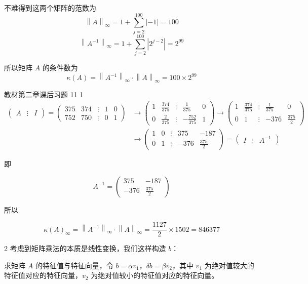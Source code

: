 不难得到这两个矩阵的范数为
\[\left\| A \right\|_{\infty} = 1 + \sum_{j = 2}^{100}\left| {- 1} \right| = 100\]
\[\left\| A^{- 1} \right\|_{\infty} = 1 + \sum_{j = 2}^{100}\left| 2^{j - 2} \right| = 2^{99}\]

所以矩阵 \(A\) 的条件数为
\[\kappa(A) = \left\| A^{- 1} \right\|_{\infty} \cdot \left\| A \right\|_{\infty} = 100 \times 2^{99}\]

教材第二章课后习题 \textbf{ }11 1 \[\begin{aligned}
\begin{pmatrix}
A & \vdots & I
\end{pmatrix} = \begin{pmatrix}
375 & 374 & \vdots & 1 & 0 \\
752 & 750 & \vdots & 0 & 1
\end{pmatrix} & \rightarrow \begin{pmatrix}
1 & \frac{374}{375} & \vdots & \frac{1}{375} & 0 \\
0 & \frac{2}{375} & \vdots & - \frac{752}{375} & 1
\end{pmatrix} \rightarrow \begin{pmatrix}
1 & \frac{374}{375} & \vdots & \frac{1}{375} & 0 \\
0 & 1 & \vdots & - 376 & \frac{375}{2}
\end{pmatrix} \\
 & \rightarrow \begin{pmatrix}
1 & 0 & \vdots & 375 & - 187 \\
0 & 1 & \vdots & - 376 & \frac{375}{2}
\end{pmatrix} = \begin{pmatrix}
I & \vdots & A^{- 1}
\end{pmatrix}
\end{aligned}\]

即

\[A^{- 1} = \begin{pmatrix}
375 & - 187 \\
 - 376 & \frac{375}{2}
\end{pmatrix}\]

所以

\[{\kappa(A)}_{\infty} = \left\| A^{- 1} \right\|_{\infty} \cdot \left\| A \right\|_{\infty} = \frac{1127}{2} \times 1502 = 846377\]

2 考虑到矩阵乘法的本质是线性变换，我们这样构造 \(b\)：

求矩阵 \(A\) 的特征值与特征向量，令
\(b = \alpha v_{1}\)，\(\delta b = \beta v_{2}\)，其中 \(v_{1}\)
为绝对值较大的特征值对应的特征向量，\(v_{2}\)
为绝对值较小的特征值对应的特征向量。


